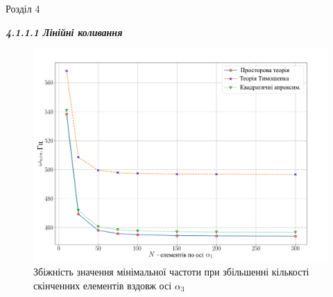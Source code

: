 \documentclass[8pt]{beamer}
\numberwithin{figure}{section}
\numberwithin{equation}{section}
\numberwithin{table}{section}
\begin{document}
\begin{frame}{Розділ 4}

\textbf{\textit{4.1.1.1 Лінійні коливання}}
\\
\vspace{1em}
\begin{figure}
	\includegraphics[scale=0.3]{pic/conv_allukr2.png}
		\caption{Збіжність значення мінімальної частоти при збільшенні кількості скінченних елементів вздовж осі $\alpha_3$}
		\label{fig:EE31}
\end{figure}

\end{frame}
\end{document}
